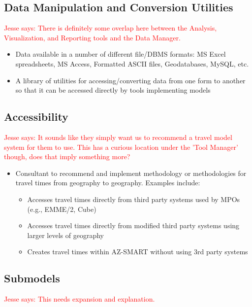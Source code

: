\documentclass[titlepage]{article}
\begin{document}
\subsection{Data Manipulation and Conversion Utilities}
\textcolor{red}{Jesse says: There is definitely some overlap here between the Analysis, Visualization, and Reporting tools and the Data Manager.}
\begin{itemize}
	\item Data available in a number of different file/DBMS formats: MS Excel spreadsheets, MS Access, Formatted ASCII files, Geodatabases, MySQL, etc.
	\item A library of utilities for accessing/converting data from one form to another so that it can be accessed directly by tools implementing models
\end{itemize}

\subsection{Accessibility}
\textcolor{red}{Jesse says: It sounds like they simply want us to recommend a travel model system for them to use.  This has a curious location under the 'Tool Manager' though, does that imply something more?}
\begin{itemize}
	\item Consultant to recommend and implement methodology or methodologies for travel times from geography to geography. Examples include:
		\begin{itemize}
			\item Accesses travel times directly from third party systems used by MPOs (e.g., EMME/2, Cube)
			\item Accesses travel times directly from modified third party systems using larger levels of geography
			\item Creates travel times within AZ-SMART without using 3rd party systems
		\end{itemize}
\end{itemize}

\subsection{Submodels}
\textcolor{red}{Jesse says: This needs expansion and explanation.}
\end{document}
